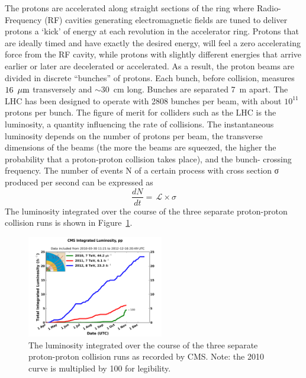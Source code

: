 \indent The protons are accelerated along straight sections of the ring where 
Radio-Frequency (RF) cavities generating electromagnetic fields are 
tuned to deliver protons a ‘kick’ of energy at each revolution in the accelerator ring. 
Protons that are ideally timed and have exactly the desired energy, will feel 
a zero accelerating force from the RF cavity, while protons with slightly different 
energies that arrive earlier or later are decelerated or accelerated. As a result, 
the proton beams are divided in discrete ``bunches'' of protons. Each bunch, before collision,
measures $16~\,\mu\text{m}$ transversely and $\sim\!\!30$~cm long. Bunches are separated 7~m apart.
The LHC has been designed to operate with 2808 bunches per beam, with about $10^{11}$ protons per bunch. 
The figure of merit for colliders such as the LHC is the luminosity, a quantity 
influencing the rate of collisions. The instantaneous luminosity depends on the number of protons
per beam, the transverse dimensions of the beams (the more the beams are squeezed,
the higher the probability that a proton-proton collision takes place), and the bunch-
crossing frequency. The number of events N of a certain process with cross section σ
produced per second can be expressed as
%
\begin{equation}
  \label{eq:lumi}
  \frac{dN}{dt} = \,\mathcal{L} \times \sigma
\end{equation}
%
The luminosity integrated over the course of the three separate proton-proton collision runs
is shown in Figure~\ref{fig:int_lumi}. 

\begin{figure}[h!]
  \begin{center}
      \includegraphics[width=0.53\textwidth,]{figures/int_lumi_cumulative_pp_2.png}
      \caption{\label{fig:int_lumi} The luminosity integrated over the course of the three 
      separate proton-proton collision runs as recorded by CMS.  
      Note: the 2010 curve is multiplied by 100 for legibility.}
  \end{center}
\end{figure}

